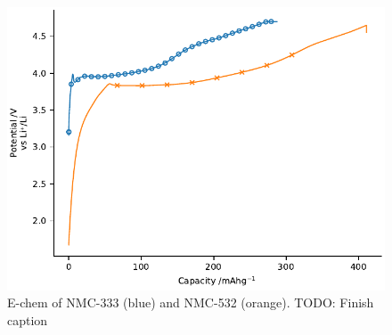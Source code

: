 \documentclass{article}
\begin{document}
\begin{figure}
  \includegraphics{figures/nmc_echem.pdf}
  \caption{E-chem of NMC-333 (blue) and NMC-532 (orange). TODO: Finish caption}
\end{figure}
\end{document}
